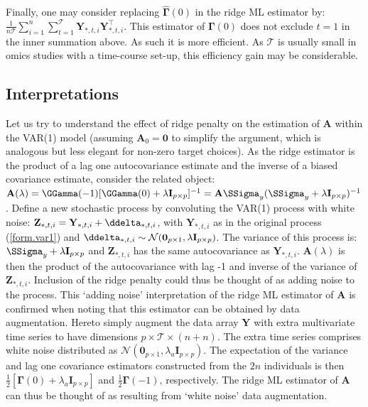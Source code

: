 Finally, one may consider replacing $\hat{\mathbf{\Gamma}}(0)$
in the ridge ML estimator by: \\$\frac{1}{n \mathcal{T}} \sum_{i=1}^n \sum_{t=1}^{\mathcal{T}} \mathbf{Y}_{\ast,t,i} \mathbf{Y}_{\ast,t,i}^{\top}$. This estimator of $\mathbf{\Gamma}(0)$ does not exclude $t=1$ in the inner summation above. As such it is more efficient. As $\mathcal{T}$ is usually small in omics studies with a time-course set-up, this efficiency gain may be considerable.



\subsection{Interpretations}
Let us try to understand the effect of ridge penalty on the estimation of $\mathbf{A}$ within the VAR(1) model (assuming $\mathbf{A}_0 = \mathbf{0}$ to simplify the argument, which is analogous but less elegant for non-zero target choices). As the ridge estimator is the product of a lag one autocovariance estimate and the inverse of a biased covariance estimate, consider the related object: $\mathbf{A}(\lambda) = \GGamma(-1) [\GGamma(0) + \lambda \mathbf{I}_{p \times p}]^{-1}  =  \mathbf{A} \SSigma_y (\SSigma_y + \lambda \mathbf{I}_{p \times p})^{-1}$. Define a new stochastic process by convoluting the VAR(1) process with white noise: $\mathbf{Z}_{\ast, t, i}   =  \mathbf{Y}_{\ast, t, i} + \ddelta_{\ast,  t, i}$, with $\mathbf{Y}_{\ast, t, i}$ as in the original process (\ref{form.var1}) and $\ddelta_{\ast, t, i} \sim \mathcal{N}(\mathbf{0}_{p \times 1}, \lambda \mathbf{I}_{p \times p})$. The variance of this process is: $\SSigma_y + \lambda \mathbf{I}_{p \times p}$ and $\mathbf{Z}_{\ast, t, i}$ has the same autocovariance as $\mathbf{Y}_{\ast, t, i}$. $\mathbf{A}(\lambda)$ is then the product of the autocovariance with lag -1 and inverse of the variance of $\mathbf{Z}_{\ast, t, i}$. Inclusion of the ridge penalty could thus be thought of as adding noise to the process. This `adding noise' interpretation of the ridge ML estimator of $\mathbf{A}$ is confirmed when noting that this estimator can be obtained by data augmentation. Hereto simply augment the data array $\mathbf{Y}$ with extra multivariate time series to have dimensions $p \times \mathcal{T} \times (n + n)$. The extra time series comprises white noise distributed as $\mathcal{N}(\mathbf{0}_{p \times 1}, \lambda_a \mathbf{I}_{p \times p})$. The expectation of the variance and lag one covariance estimators constructed from the $2n$ individuals is then $\frac{1}{2} [ \mathbf{\Gamma}(0) + \lambda_a \mathbf{I}_{p \times p} ]$ and $\frac{1}{2} \mathbf{\Gamma}(-1)$, respectively. The ridge ML estimator of $\mathbf{A}$ can thus be thought of as resulting from `white noise' data augmentation.

